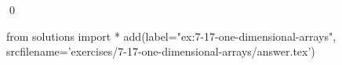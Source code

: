 
\begin{ex}
  \label{ex:7-17-one-dimensional-arrays}
  
  \qed
\end{ex}
\begin{python0}
from solutions import *
add(label="ex:7-17-one-dimensional-arrays",
    srcfilename='exercises/7-17-one-dimensional-arrays/answer.tex')
\end{python0}
